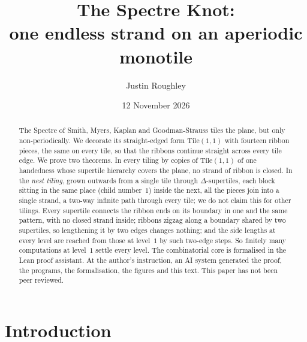 \documentclass[11pt]{amsart}
\title[The Spectre Knot]{The Spectre Knot:\\ one endless strand on an aperiodic monotile}
\author{Justin Roughley}
\date{12 November 2026}
\theoremstyle{definition}
\theoremstyle{remark}
\newcommand{\Tile}{\mathrm{Tile}(1,1)}
\begin{document}
\begin{abstract}
The Spectre of Smith, Myers, Kaplan and Goodman-Strauss tiles the plane, but only non-periodically. We decorate its
straight-edged form $\Tile$ with fourteen ribbon pieces, the same on every tile, so that the ribbons continue straight
across every tile edge. We prove two theorems. In every tiling by copies of $\Tile$ of one handedness whose supertile
hierarchy covers the plane, no strand of ribbon is closed. In the \emph{nest tiling}, grown outwards from a single tile
through $\Delta$-supertiles, each block sitting in the same place (child number~$1$) inside the next, all the pieces
join into a single strand, a two-way infinite path through every tile; we do not claim this for other tilings. Every
supertile connects the ribbon ends on its boundary in one and the same pattern, with no closed strand inside; ribbons
zigzag along a boundary shared by two supertiles, so lengthening it by two edges changes nothing; and the side lengths
at every level are reached from those at level~$1$ by such two-edge steps. So finitely many computations at level~$1$
settle every level. The combinatorial core is formalised in the Lean proof assistant. At the author's instruction, an
AI system generated the proof, the programs, the formalisation, the figures and this text. This paper has not been peer
reviewed.
\end{abstract}

\maketitle

\section{Introduction}\label{sec:intro}
\end{document}

